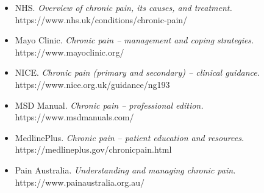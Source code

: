 \begin{itemize}
    \item NHS. \textit{Overview of chronic pain, its causes, and treatment.} https://www.nhs.uk/conditions/chronic-pain/
    \item Mayo Clinic. \textit{Chronic pain -- management and coping strategies.} https://www.mayoclinic.org/
    \item NICE. \textit{Chronic pain (primary and secondary) -- clinical guidance.} https://www.nice.org.uk/guidance/ng193
    \item MSD Manual. \textit{Chronic pain -- professional edition.} https://www.msdmanuals.com/
    \item MedlinePlus. \textit{Chronic pain -- patient education and resources.} https://medlineplus.gov/chronicpain.html
    \item Pain Australia. \textit{Understanding and managing chronic pain.} https://www.painaustralia.org.au/
\end{itemize}
